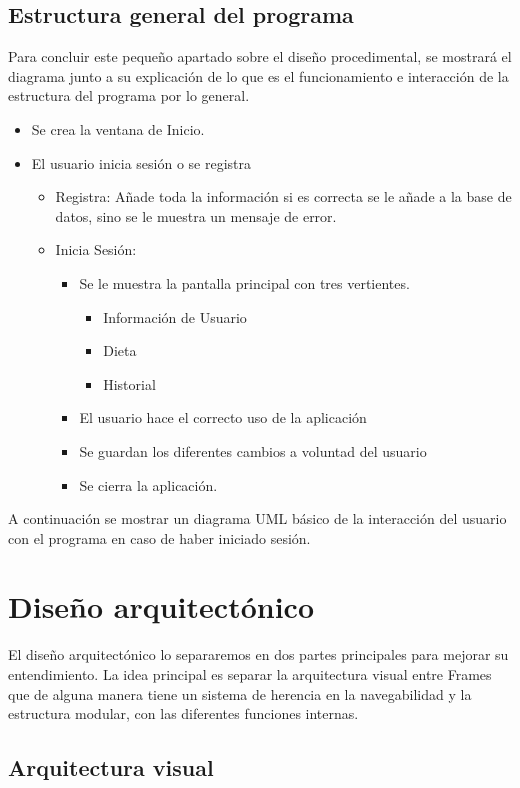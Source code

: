 \subsection{Estructura general del programa}
Para concluir este pequeño apartado sobre el diseño procedimental, se mostrará el diagrama junto a su explicación de lo que es el funcionamiento e interacción de la estructura del programa por lo general.
\begin{itemize}
\item Se crea la ventana de Inicio.
\item El usuario inicia sesión o se registra
\begin{itemize}
\item Registra: Añade toda la información si es correcta se le añade a la base de datos, sino se le muestra un mensaje de error.
\item Inicia Sesión:
\begin{itemize}
\item Se le muestra la pantalla principal con tres vertientes.
\begin{itemize}
\item Información de Usuario
\item Dieta
\item Historial
\end{itemize}
\item El usuario hace el correcto uso de la aplicación
\item Se guardan los diferentes cambios a voluntad del usuario
\item Se cierra la aplicación.
\end{itemize}
\end{itemize}
\end{itemize}
A continuación se mostrar un diagrama UML básico de la interacción del usuario con el programa en caso de haber iniciado sesión.
\section{Diseño arquitectónico}
El diseño arquitectónico lo separaremos en dos partes principales para mejorar su entendimiento. La idea principal es separar la arquitectura visual entre Frames que de alguna manera tiene un sistema de herencia en la navegabilidad y la estructura modular, con las diferentes funciones internas.
\subsection{Arquitectura visual}
